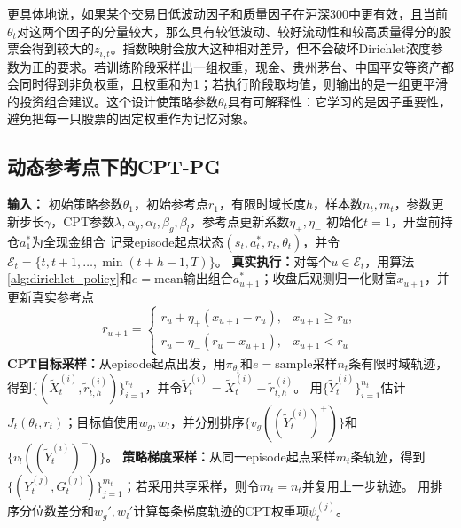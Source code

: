 更具体地说，如果某个交易日低波动因子和质量因子在沪深300中更有效，且当前$\theta_t$对这两个因子的分量较大，那么具有较低波动、较好流动性和较高质量得分的股票会得到较大的$z_{i,t}$。指数映射会放大这种相对差异，但不会破坏Dirichlet浓度参数为正的要求。若训练阶段采样出一组权重，现金、贵州茅台、中国平安等资产都会同时得到非负权重，且权重和为1；若执行阶段取均值，则输出的是一组更平滑的投资组合建议。这个设计使策略参数$\theta_t$具有可解释性：它学习的是因子重要性，避免把每一只股票的固定权重作为记忆对象。

\subsection{动态参考点下的CPT-PG}

\begin{algorithm}[H]
\caption{基于动态参考点的CPT-PG在线优化器}
\label{alg:drcpt_pg}
\begin{algorithmic}[1]
\STATE \textbf{输入：} 初始策略参数$\theta_1$，初始参考点$r_1$，有限时域长度$h$，样本数$n_t,m_t$，参数更新步长$\gamma$，CPT参数$\lambda,\alpha_g,\alpha_l,\beta_g,\beta_l$，参考点更新系数$\eta_+,\eta_-$
\STATE 初始化$t=1$，开盘前持仓$a_1^*$为全现金组合
    \STATE 记录episode起点状态$(s_t,a_t^*,r_t,\theta_t)$，并令$\mathcal{E}_t=\{t,t+1,\ldots,\min(t+h-1,T)\}$。
    \STATE \textbf{真实执行：}对每个$u\in\mathcal{E}_t$，用算法\ref{alg:dirichlet_policy}和$e=\mathrm{mean}$输出组合$a_{u+1}^*$；收盘后观测归一化财富$x_{u+1}$，并更新真实参考点
    \begin{equation*}
    r_{u+1}
    =
    \begin{cases}
    r_u+\eta_+\left(x_{u+1}-r_u\right), & x_{u+1}\ge r_u,\\[4pt]
    r_u-\eta_-\left(r_u-x_{u+1}\right), & x_{u+1}<r_u
    \end{cases}
    \end{equation*}
    \STATE \textbf{CPT目标采样：}从episode起点出发，用$\pi_{\theta_t}$和$e=\mathrm{sample}$采样$n_t$条有限时域轨迹，得到$\{(\widetilde X_t^{(i)},\widetilde r_{t,h}^{(i)})\}_{i=1}^{n_t}$，并令$\widetilde Y_t^{(i)}=\widetilde X_t^{(i)}-\widetilde r_{t,h}^{(i)}$。
    \STATE 用$\{\widetilde Y_t^{(i)}\}_{i=1}^{n_t}$估计$J_t(\theta_t,r_t)$；目标值使用$w_g,w_l$，并分别排序$\{v_g((\widetilde Y_t^{(i)})^+)\}$和$\{v_l((\widetilde Y_t^{(i)})^-)\}$。
    \STATE \textbf{策略梯度采样：}从同一episode起点采样$m_t$条轨迹，得到$\{(Y_t^{(j)},G_t^{(j)})\}_{j=1}^{m_t}$；若采用共享采样，则令$m_t=n_t$并复用上一步轨迹。
    \STATE 用排序分位数差分和$w_g',w_l'$计算每条梯度轨迹的CPT权重项$\psi_t^{(j)}$。

\end{algorithmic}
\end{algorithm}
